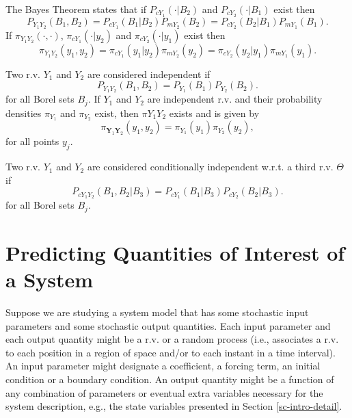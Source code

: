 The Bayes Theorem \cite{KaSo05} states that
if $P_{cY_1}(\cdot|B_2)$ and $P_{cY_2}(\cdot|B_1)$ exist then
\begin{equation}\label{eq-Bayes-1}
P_{Y_1Y_2}(B_1,B_2) = P_{cY_1}(B_1|B_2)P_{mY_2}(B_2) = P_{cY_2}(B_2|B_1)P_{mY_1}(B_1).
\end{equation}
If $\pi_{Y_1Y_2}(\cdot,\cdot)$, $\pi_{cY_1}(\cdot|y_2)$ and $\pi_{cY_2}(\cdot|y_1)$ exist then
\begin{equation}\label{eq-Bayes-2}
\pi_{Y_1Y_2}(y_1,y_2) = \pi_{cY_1}(y_1|y_2)\pi_{mY_2}(y_2) = \pi_{cY_2}(y_2|y_1)\pi_{mY_1}(y_1).
\end{equation}

Two r.v. $Y_1$ and $Y_2$ are considered independent if
\begin{equation*}
P_{Y_1Y_2}(B_1,B_2) = P_{Y_1}(B_1)P_{Y_2}(B_2).
\end{equation*}
for all Borel sets $B_j$.
If $Y_1$ and $Y_2$ are independent r.v. and
their probability densities $\pi_{Y_1}$ and $\pi_{Y_2}$ exist,
then $\pi{Y_1Y_2}$ exists and is given by
\begin{equation*}
\pi_{\mathbf{Y}_1\mathbf{Y}_2}(y_1,y_2) = \pi_{Y_1}(y_1)\pi_{Y_2}(y_2),
\end{equation*}
for all points $y_j$.

Two r.v. $Y_1$ and $Y_2$ are considered conditionally independent w.r.t. a third r.v. $\Theta$ if
\begin{equation*}
P_{cY_1Y_2}(B_1,B_2|B_3) = P_{cY_1}(B_1|B_3)P_{cY_2}(B_2|B_3).
\end{equation*}
for all Borel sets $B_j$.


\section{Predicting Quantities of Interest of a System}\label{sc-intro-qoi}

Suppose we are studying a system model that has
some stochastic input parameters and some stochastic output quantities.
Each input parameter and each output quantity might be a r.v. or a random process
(i.e., associates a r.v. to each position in a region of space and/or to each instant in a time interval).
An input parameter might designate a coefficient, a forcing term, an initial condition or a boundary condition.
An output quantity might be a function of any combination of parameters or eventual extra variables necessary for the system description, e.g.,
the state variables presented in Section \ref{sc-intro-detail}.

